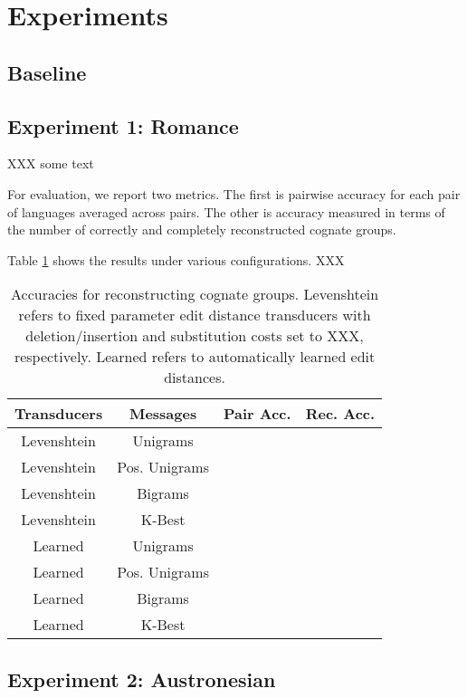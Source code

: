 \documentclass[11pt,a4paper]{article}
\begin{document}
\section{Experiments}

\subsection{Baseline}

\subsection{Experiment 1: Romance}

XXX some text


For evaluation, we report two metrics. The first is pairwise accuracy
for each pair of languages averaged across pairs. The other
is accuracy measured in terms of the number of correctly and
completely reconstructed cognate groups. 

Table \ref{tbl:exp1} shows the results under various configurations. XXX

\begin{table}
  \begin{tabular}{|c|c|c|c|}
    Transducers & Messages & Pair Acc. & Rec. Acc.\\
    \hline
    \hline
    Levenshtein&Unigrams & & \\
    Levenshtein&Pos. Unigrams & & \\
    Levenshtein&Bigrams & & \\
    Levenshtein&K-Best & & \\
    \hline
    Learned&Unigrams & & \\
    Learned&Pos. Unigrams & & \\
    Learned&Bigrams & & \\
    Learned&K-Best & & \\
  \end{tabular}
  \caption{Accuracies for reconstructing cognate groups. Levenshtein
  refers to fixed parameter edit distance transducers with
  deletion/insertion and substitution costs set to XXX, respectively.
  Learned refers to automatically learned edit distances.}
  \label{tbl:exp1}
\end{table}

\subsection{Experiment 2: Austronesian}
\end{document}
